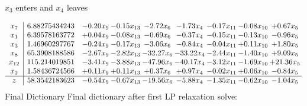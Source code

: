 \documentclass[8pt]{article}
\begin{document}
 $ x_{3} $ enters and $ x_{4} $ leaves 

 \[\begin{array}{c| c c@{\hskip 2pt} c@{\hskip 2pt} c@{\hskip 2pt} c@{\hskip 2pt} c@{\hskip 2pt} c@{\hskip 2pt} c@{\hskip 2pt} }
 x_{7}   &  6.88275434243 & -0.20 x_{9} & -0.15 x_{13} & -2.72 x_{6} & -1.73 x_{4} & -0.17 x_{11} & -0.08 x_{10} & +  0.67 x_{5}\\
 x_{1}   &  6.39578163772 & +  0.04 x_{9} & -0.08 x_{13} & -0.69 x_{6} & -0.37 x_{4} & -0.15 x_{11} & -0.13 x_{10} & -0.96 x_{5}\\
 x_{3}   &  1.46960297767 & -0.24 x_{9} & -0.17 x_{13} & -3.06 x_{6} & -0.84 x_{4} & -0.04 x_{11} & +  0.11 x_{10} & +  1.80 x_{5}\\
 x_{8}   &  65.3908188586 & -2.67 x_{9} & -2.82 x_{13} & -32.27 x_{6} & -33.22 x_{4} & -2.44 x_{11} & -1.40 x_{10} & +  9.09 x_{5}\\
 x_{12}   &  115.214019851 & -3.41 x_{9} & -3.88 x_{13} & -47.96 x_{6} & -40.17 x_{4} & -3.12 x_{11} & -1.69 x_{10} & + 21.36 x_{5}\\
 x_{2}   &  1.58436724566 & +  0.11 x_{9} & +  0.11 x_{13} & +  0.37 x_{6} & +  0.97 x_{4} & -0.02 x_{11} & +  0.06 x_{10} & -0.84 x_{5}\\
\hline
z    &  58.3542183623 & -0.54 x_{9} & -0.67 x_{13} & -19.56 x_{6} & -5.88 x_{4} & -1.35 x_{11} & -0.62 x_{10} & -1.04 x_{5}\\
\end{array}\]
Final Dictionary
Final dictionary after first LP relaxation solve: 
\end{document}
